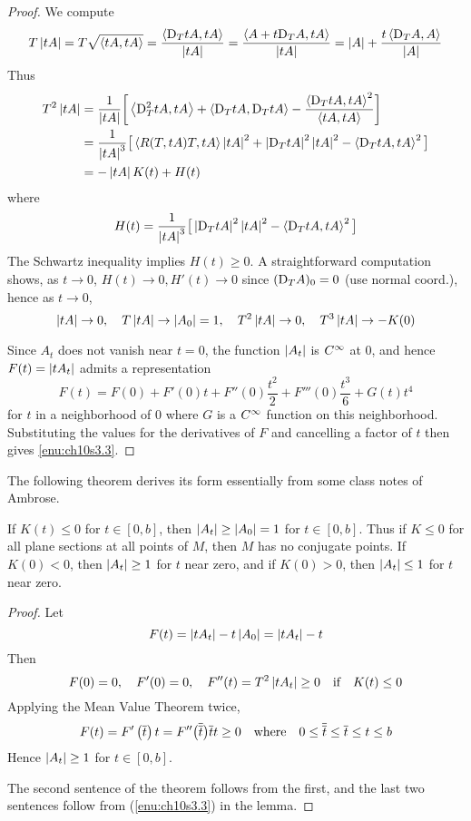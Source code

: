 \documentclass[../main]{subfiles}
\begin{document}
\begin{proof}
We compute
\[T\left|tA\right| = T\sqrt{\left\langle tA,tA\right\rangle}
= \frac{\left\langle\mathrm{D}_TtA,tA\right\rangle}{\left|tA\right|}
= \frac{\left\langle A+t\mathrm{D}_TA,tA\right\rangle}{\left|tA\right|}
= \left|A\right| + \frac{t\left\langle\mathrm{D}_TA,A\right\rangle}{\left|A\right|}\]
Thus
\begin{align*}
    T^2\left|tA\right| &= \frac{1}{\left|tA\right|}\bigg[\left\langle\mathrm{D}_T^2tA,tA\right\rangle + \left\langle\mathrm{D}_TtA,\mathrm{D}_TtA\right\rangle - \frac{\left\langle\mathrm{D}_TtA,tA\right\rangle^2}{\left\langle tA,tA\right\rangle}\bigg] \\
    &= \frac{1}{\left|tA\right|^3}\big[\left\langle R(T,tA)T,tA\right\rangle\left|tA\right|^2 + \left|\mathrm{D}_TtA\right|^2\left|tA\right|^2 - \left\langle\mathrm{D}_TtA,tA\right\rangle^2\big] \\
    &= -\left|tA\right|K(t) + H(t)
\end{align*}
where
\[H(t) = \frac{1}{\left|tA\right|^3}\big[\left|\mathrm{D}_TtA\right|^2\left|tA\right|^2 - \left\langle\mathrm{D}_TtA,tA\right\rangle^2\big]\]
The Schwartz inequality implies $H(t)\ge0$. A straightforward computation shows, as $t\to0$,
$H(t)\to0, H'(t)\to0$
since $(\mathrm{D}_TA)_0=0$ (use normal coord.), hence as $t\to0$,
\[\left|tA\right|\to0,
\quad T\left|tA\right|\to\left|A_0\right|=1,
\quad T^2\left|tA\right|\to0,
\quad T^3\left|tA\right|\to-K(0)\]

Since $A_t$ does not vanish near $t=0$, the function $\left|A_t\right|$ is $C^\infty$ at 0, and hence $F(t)=\left|tA_t\right|$ admits a representation
\[F(t) = F(0) + F'(0)t + F''(0)\frac{t^2}{2} + F'''(0)\frac{t^3}{6} + G(t)t^4\]
for $t$ in a neighborhood of 0 where $G$ is a $C^\infty$ function on this neighborhood. Substituting the values for the derivatives of $F$ and cancelling a factor of $t$ then gives \ref{enu:ch10s3.3}.
\end{proof}



The following theorem derives its form essentially from some class notes of Ambrose. 



\begin{theorem} \label{thm:ch10.3.2}
If $K(t)\le0$ for $t\in[0,b]$, then $\left|A_t\right|\ge\left|A_0\right|=1$ for $t\in[0,b]$. Thus if $K\le0$ for all plane sections at all points of $M$, then $M$ has no conjugate points. If $K(0)<0$, then $\left|A_t\right|\ge1$ for $t$ near zero, and if $K(0)>0$, then $\left|A_t\right|\le1$ for $t$ near zero.
\end{theorem}

\begin{proof}
Let
\[F(t) = \left|tA_t\right| - t\left|A_0\right|
= \left|tA_t\right| - t\]
Then
\[F(0)=0,
\quad F'(0)=0,
\quad F''(t)=T^2\left|tA_t\right|\ge0
\quad \text{if} \quad K(t)\le0\]
Applying the Mean Value Theorem twice,
\[F(t) = F'\left(\overline t\right)t
= F''\big(\overline{\overline t}\big)\overline tt\ge0
\quad \text{where} \quad 0\le\overline{\overline t}\le\overline t\le t\le b\]
Hence $\left|A_t\right|\ge1$ for $t\in[0,b]$.

The second sentence of the theorem follows from the first, and the last two sentences follow from (\ref{enu:ch10s3.3}) in the lemma.
\end{proof}
\end{document}
